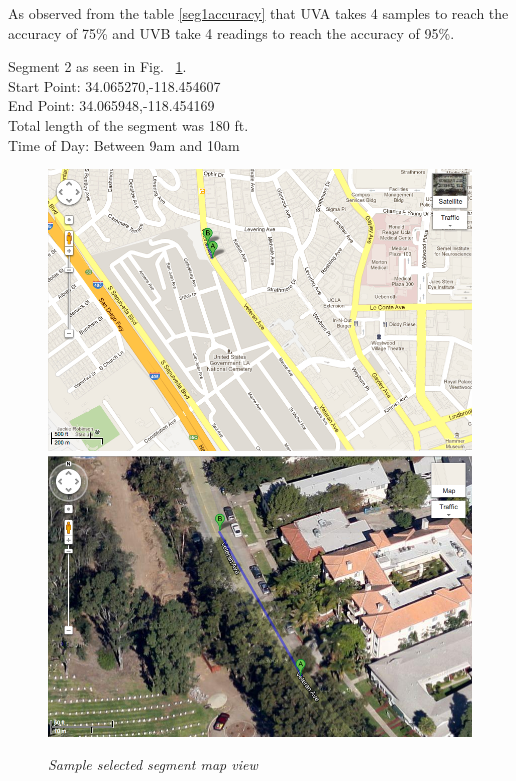 \documentclass[12pt,fullpage,doublespace]{article}
\begin{document}
As observed from the table \ref{seg1accuracy} that UVA takes 4 samples to reach the accuracy of 75\% and UVB take 4 readings to reach the accuracy of 95\%. 
\newpage


\newpage
\begin{center}
Segment 2 as seen in Fig. ~\ref{fig:segment2}. \\
Start Point:  34.065270,-118.454607\\
End Point:  34.065948,-118.454169\\
Total length of the segment was 180 ft.\\
Time of Day: Between 9am and 10am\\
\begin{figure}[h]
\begin{center}
\includegraphics[scale=0.32]{segment2a.png}
\includegraphics[scale=0.32]{segment2b.png}
\caption{\small \sl Sample selected segment map view}\label{fig:segment2}
\end{center}
\end{figure}
\end{center}
\end{document}
